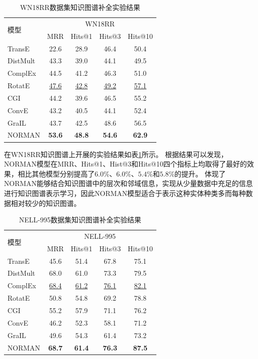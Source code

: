 \documentclass[algorithmlist, AutoFakeBold, AutoFakeSlant, figurelist, tablelist, nomlist, engineering, openany]{seuthesix} %
\begin{document}
\begin{table}[t]
  \centering
  \caption{WN18RR数据集知识图谱补全实验结果}
  \begin{tabular*}{0.95\textwidth}{@{\extracolsep{\fill}}lcccc}
    \toprule[1pt]
    \multirow{2}{*}{模型} & \multicolumn{4}{c}{WN18RR} \\
      & MRR & Hits@1 & Hits@3 & Hits@10 \\ \hline
    TransE & 22.6 & 28.9 & 46.4 & 50.4 \\
    DistMult & 43.3 & 39.0 & 44.1 & 49.5 \\
    ComplEx & 44.5 & 41.2 & 46.3 & 51.0 \\
    RotatE & \underline{47.6} & \underline{42.8} & \underline{49.2} & \underline{57.1} \\
    CGI & 44.2 & 39.6 & 46.5 & 55.2 \\
    ConvE & 43.2 & 40.5 & 44.1 & 52.4 \\
    GraIL & 43.7 & 42.5 & 48.6 & 56.5 \\
    NORMAN & \textbf{53.6} & \textbf{48.8} & \textbf{54.6} & \textbf{62.9} \\
    \bottomrule[1pt]
  \end{tabular*}
  \label{Experiment1_WN18RR}
\end{table}

在WN18RR知识图谱上开展的实验结果如表\ref{Experiment1_WN18RR}所示。
根据结果可以发现，NORMAN模型在MRR、Hits@1、Hist@3和Hits@10四个指标上均取得了最好的效果，相比其他模型分别提高了$6.0\%$、$6.0\%$、$5.4\%$和$5.8\%$的提升。
体现了NORMAN能够结合知识图谱中的层次和邻域信息，实现从少量数据中充足的信息进行知识图谱表示学习，因此NORMAN模型适合于表示这种实体种类多而每种数据相对较少的知识图谱。

\begin{table}[t]
  \centering
  \caption{NELL-995数据集知识图谱补全实验结果}
  \begin{tabular*}{0.95\textwidth}{@{\extracolsep{\fill}}lcccc}
    \toprule[1pt]
    \multirow{2}{*}{模型} & \multicolumn{4}{c}{NELL-995} \\
      & MRR & Hits@1 & Hits@3 & Hits@10 \\ \hline
    TransE & 45.6 & 51.4 & 67.8 & 75.1 \\
    DistMult & 68.0 & 61.0 & 73.3 & 79.5 \\
    ComplEx & \underline{68.4} & \underline{61.2} & \underline{76.1} & \underline{82.1} \\
    RotatE & 50.8 & 54.8 & 69.2 & 78.8 \\
    CGI & 55.2 & 57.9 & 71.1 & 76.2 \\
    ConvE & 46.2 & 52.3 & 58.1 & 71.2 \\
    GraIL & 49.6 & 54.3 & 61.4 & 73.2 \\
    NORMAN & \textbf{68.7} & \textbf{61.4} & \textbf{76.3} & \textbf{87.5} \\
    \bottomrule[1pt]
  \end{tabular*}
  \label{Experiment1_NELL-995}
\end{table}
\end{document}
